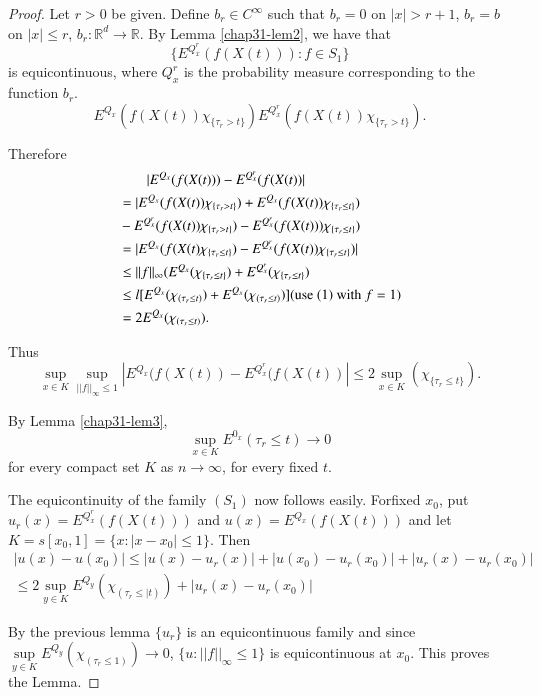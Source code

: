 \begin{proof}
Let $r>0$ be given. Define $b_{r}\in C^{\infty}$ such that $b_{r}=0$
on $|x|>r+1$, $b_{r}=b$ on $|x|\leq r$, $b_{r}:\mathbb{R}^{d}\to
\mathbb{R}$. By Lemma \ref{chap31-lem2}, we have that
$$
\{E^{Q^{r}_{x}}(f(X(t))):f\in S_{1}\}
$$\pageoriginale
is equicontinuous, where $Q^{r}_{x}$ is the probability measure
corresponding to the function $b_{r}$.
\begin{equation*}
E^{Q_{x}}(f(X(t))\chi_{\{\tau_{r}>t\}})E^{Q^{r}_{x}}(f(X(t))\chi_{\{\tau_{r}>t\}}).\tag{1}\label{chap31-addeq1} 
\end{equation*}

Therefore
\begin{align*}
&\qquad |E^{Q_{x}}(f(X(t)))-E^{Q^{r}_{x}}(f(X(t))|\\
&=
  |E^{Q_{x}}(f(X(t))\chi_{\{\tau_{r}>t\}})+E^{Q_{x}}(f(X(t))\chi_{\{\tau_{r}\leq
    t\}})\\ 
&-
  E^{Q^{r}_{x}}(f(X(t))\chi_{\{\tau_{r}>t\}})-E^{Q^{r}_{x}}(f(X(t)))\chi_{\{\tau_{r}\leq
    t\}})\\
&= |E^{Q_{x}}(f(X(t)\chi_{\{\tau_{r}\leq
    t\}})-E^{Q^{r}_{x}}(f(X(t))\chi_{\{\tau_{r}\leq t\}})|\\
&\leq ||f||_{\infty}(E^{Q_{x}}(\chi_{\{\tau_{r}\leq
    t\}})+E^{Q^{r}_{x}}(\chi_{\{\tau_{r}\leq t\}})\\
&\leq l[E^{Q_{x}}(\chi_{(\tau_{r}\leq
      t)})+E^{Q_{x}}(\chi_{(\tau_{r}\leq t)})](\text{use (1)  with~ }
  f=1)\\
&= 2E^{Q_{x}}(\chi_{(\tau_{r}\leq t)}).
\end{align*}

Thus
$$
\sup\limits_{x\in K}\sup\limits_{||f||_{\infty}\leq
  1}|E^{Q_{x}}(f(X(t))-E^{Q^{r}_{x}}(f(X(t))|\leq 2\sup\limits_{x\in
  K}(\chi_{\{\tau_{r}\leq t\}}).
$$

By Lemma \ref{chap31-lem3},
$$
\sup\limits_{x\in K}E^{0_{x}}(\tau_{r}\leq t)\to 0
$$
for every compact set $K$ as $n\to \infty$, for every fixed $t$.

The equicontinuity of the family $(S_{1})$ now follows
easily. For\pageoriginale fixed $x_{0}$, put
$u_{r}(x)=E^{Q^{r}_{x}}(f(X(t)))$ and $u(x)=E^{Q_{x}}(f(X(t)))$ and
let $K=s[x_{0},1]=\{x:|x-x_{0}|\leq 1\}$. Then
\begin{gather*}
|u(x)-u(x_{0})|\leq
|u(x)-u_{r}(x)|+|u(x_{0})-u_{r}(x_{0})|+|u_{r}(x)-u_{r}(x_{0})|\\
\leq 2\sup\limits_{y\in K}E^{Q_{y}}(\chi_{(\tau_{r}\leq
|t)})+|u_{r}(x)-u_{r}(x_{0})| 
\end{gather*}

By the previous lemma $\{u_{r}\}$ is an equicontinuous family and
since $\sup\limits_{y\in K}E^{Q_{y}}(\chi_{(\tau_{r}\leq 1)})\to 0$,
$\{u:||f||_{\infty}\leq 1\}$ is equicontinuous at $x_{0}$. This proves
the Lemma. 
\end{proof}

